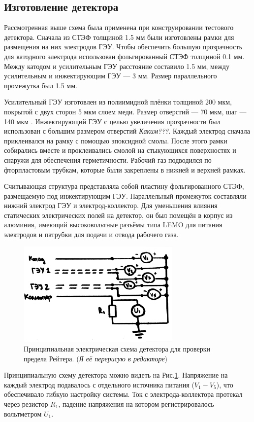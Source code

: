 \subsection{Изготовление детектора}
Рассмотренная выше схема была применена при конструировании тестового детектора. Сначала из СТЭФ толщиной 1.5 мм были изготовлены рамки для размещения на них электродов ГЭУ. Чтобы обеспечить большую прозрачность для катодного электрода использован фольгированный СТЭФ толщиной 0.1 мм. Между катодом и усилительным ГЭУ расстояние составило 1.5 мм, между усилительным и инжектирующим ГЭУ --- 3 мм. Размер параллельного промежутка был 1.5 мм.
\par Усилительный ГЭУ изготовлен из полиимидной плёнки толщиной 200 мкм, покрытой с двух сторон 5 мкм слоем меди. Размер отверстий --- 70 мкм, шаг --- 140 мкм \cite{sauli}. Инжектирующий ГЭУ с целью увеличения прозрачности был использован с большим размером отверстий \textit{Каким???}. Каждый электрод сначала приклеивался на рамку с помощью эпоксидной смолы. После этого рамки собирались вместе и проклеивались смолой на стыкующихся поверхностях и снаружи для обеспечения герметичности. Рабочий газ подводился по фторпластовым трубкам, которые были закреплены в нижней и верхней рамках.
\par Считывающая структура представляла собой пластину фольгированного СТЭФ, размещаемую под инжектирующим ГЭУ. Параллельный промежуток составляли нижний электрод ГЭУ и электрод-коллектор. Для уменьшения влияния статических электрических полей на детектор, он был помещён в корпус из алюминия, имеющий высоковольтные разъёмы типа LEMO для питания электродов и патрубки для подачи и отвода рабочего газа.  
\begin{figure}[H]
	\begin{center}
		\includegraphics[width = 8cm]{img/Scheme_raether_det.pdf}
		\caption{Принципиальная электрическая схема детектора для проверки предела Рейтера. (\textit{Я её перерисую в редакторе})}
		\label{el_scheme_raether}
	\end{center}
\end{figure}
\noindent
\par Принципиальную схему детектора можно видеть на Рис.\ref{el_scheme_raether}. Напряжение на каждый электрод подавалось с отдельного источника питания ($V_1-V_5$), что обеспечивало гибкую настройку системы.
Ток с электрода-коллектора протекал через резистор $R_1$, падение напряжения на котором регистрировалось вольтметром $U_1$. 
